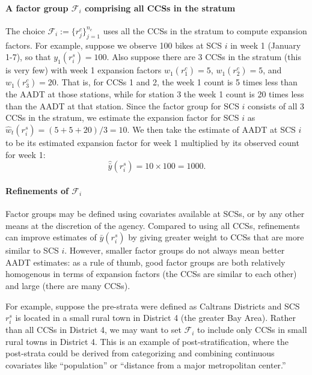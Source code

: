 \documentclass[11pt]{article}
\begin{document}
    \paragraph{\texorpdfstring{A factor group \(\mathcal{F}_i\) comprising
all CCSs in the
stratum}{A factor group \textbackslash mathcal\{F\}\_i comprising all CCSs in the stratum}}\label{a-factor-group-mathcalf_i-comprising-all-ccss-in-the-stratum}

The choice \(\mathcal{F}_i := \{r_j^c\}_{j=1}^{n_c}\) uses all the CCSs
in the stratum to compute expansion factors. For example, suppose we
observe 100 bikes at SCS \(i\) in week 1 (January 1-7), so that
\(y_1(r_i^s) = 100\). Also suppose there are 3 CCSs in the stratum (this
is very few) with week 1 expansion factors \(w_1(r_1^c) = 5\),
\(w_1(r_2^c) = 5\), and \(w_1(r_3^c) = 20\). That is, for CCSs 1 and 2,
the week 1 count is 5 times less than the AADT at those stations, while
for station 3 the week 1 count is 20 times less than the AADT at that
station. Since the factor group for SCS \(i\) consists of all 3 CCSs in
the stratum, we estimate the expansion factor for SCS \(i\) as
\(\hat{w}_{t}(r_i^s) = (5 + 5 + 20) / 3 = 10\). We then take the
estimate of AADT at SCS \(i\) to be its estimated expansion factor for
week 1 multiplied by its observed count for week 1:
\[\hat{\bar{y}}(r_i^s) = 10 \times 100 = 1000.\]

    \paragraph{\texorpdfstring{Refinements of
\(\mathcal{F}_i\)}{Refinements of \textbackslash mathcal\{F\}\_i}}\label{refinements-of-mathcalf_i}

Factor groups may be defined using covariates available at SCSs, or by
any other means at the discretion of the agency. Compared to using all
CCSs, refinements can improve estimates of \(\bar{y}(r_i^s)\) by giving
greater weight to CCSs that are more similar to SCS \(i\). However,
smaller factor groups do not always mean better AADT estimates: as a
rule of thumb, good factor groups are both relatively homogenous in
terms of expansion factors (the CCSs are similar to each other) and
large (there are many CCSs).

For example, suppose the pre-strata were defined as Caltrans Districts
and SCS \(r_i^s\) is located in a small rural town in District 4 (the
greater Bay Area). Rather than all CCSs in District 4, we may want to
set \(\mathcal{F}_i\) to include only CCSs in small rural towns in
District 4. This is an example of post-stratification, where the
post-strata could be derived from categorizing and combining continuous
covariates like ``population'' or ``distance from a major metropolitan
center.''
\end{document}
